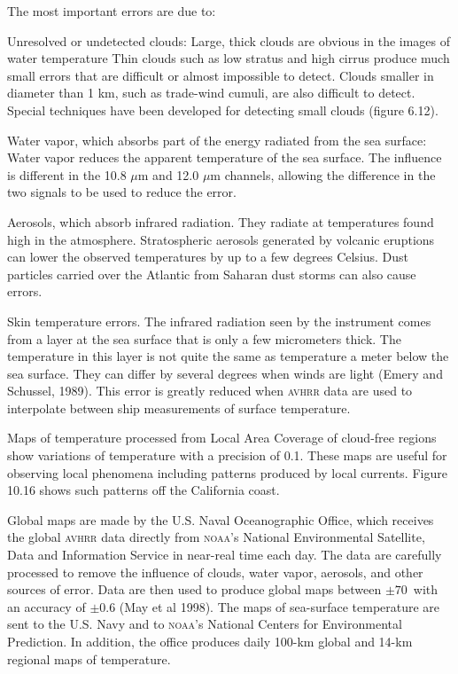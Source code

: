 The most important errors are due to:
\begin{enumerate}
\vitem Unresolved or undetected clouds: Large, thick clouds are
obvious in the images of water temperature Thin clouds such as low
stratus and high cirrus produce much small errors that are difficult
or almost impossible to detect. Clouds smaller in diameter than 1 km,
such as trade-wind cumuli, are also difficult to detect. Special
techniques have been developed for detecting small clouds (figure
6.12).

\vitem Water vapor, which absorbs part of the energy radiated from the
sea surface: Water vapor reduces the apparent temperature of the sea
surface. The influence is different in the 10.8 $\mu$m and 12.0 $\mu$m
channels, allowing the difference in the two signals to be used to
reduce the error.

\vitem Aerosols, which absorb infrared radiation. They radiate at
temperatures found high in the atmosphere. Stratospheric aerosols
generated by volcanic eruptions can lower the observed temperatures by
up to a few degrees Celsius. Dust particles carried over the Atlantic
from Saharan dust storms can also cause errors.

\vitem Skin temperature errors. The infrared radiation seen by the
instrument comes from a layer at the sea surface that is only a few
micrometers thick. The temperature in this layer is not quite the same
as temperature a meter below the sea surface. They can differ by
several degrees when winds are light (Emery and Schussel,
1989). This
error is greatly reduced when \textsc{avhrr} data are used to interpolate between
ship measurements of surface temperature.
\end{enumerate}

Maps of temperature processed from Local Area Coverage of cloud-free
regions show variations of temperature with a precision of
0.1. These maps are useful for observing local phenomena
including patterns produced by local currents. Figure 10.16 shows such
patterns off the California coast.

Global maps are made by the U.S. Naval Oceanographic Office, which
receives the global \textsc{avhrr} data directly from \textsc{noaa}'s
National Environmental Satellite, Data and Information Service in
near-real time each day. The data are carefully processed to remove
the influence of clouds, water vapor, aerosols, and other sources of
error. Data are then used to produce global maps between $\pm
70$\degrees\ with an accuracy
of $\pm 0.6$ (May et al 1998). The maps of sea-surface
temperature are sent to the U.S. Navy and to \textsc{noaa}'s National
Centers for Environmental Prediction. In addition, the office produces
daily 100-km global and 14-km regional maps of temperature.

